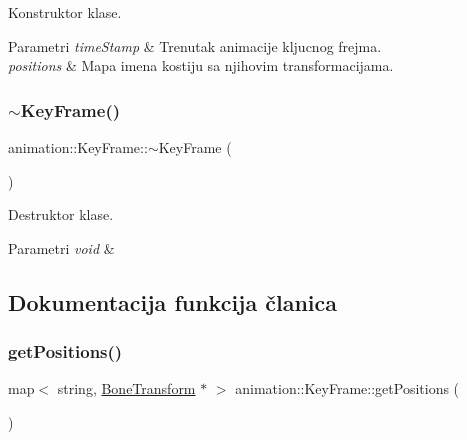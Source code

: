 Konstruktor klase. 


\begin{DoxyParams}{Parametri}
{\em time\+Stamp} & Trenutak animacije kljucnog frejma. \\
\hline
{\em positions} & Mapa imena kostiju sa njihovim transformacijama. \\
\hline
\end{DoxyParams}
\mbox{\label{classanimation_1_1KeyFrame_adf0e5cec6ec1d5d91d8fd68b1b523c12}} 
\subsubsection{\texorpdfstring{$\sim$\+Key\+Frame()}{~KeyFrame()}}
{\footnotesize\ttfamily animation\+::\+Key\+Frame\+::$\sim$\+Key\+Frame (\begin{DoxyParamCaption}{ }\end{DoxyParamCaption})}



Destruktor klase. 


\begin{DoxyParams}{Parametri}
{\em void} & \\
\hline
\end{DoxyParams}


\subsection{Dokumentacija funkcija članica}
\mbox{\label{classanimation_1_1KeyFrame_a0836ea59aee5e8ba67a683d40798f143}} 
\subsubsection{\texorpdfstring{get\+Positions()}{getPositions()}}
{\footnotesize\ttfamily map$<$ string, \hyperlink{classanimation_1_1BoneTransform}{Bone\+Transform} $\ast$ $>$ animation\+::\+Key\+Frame\+::get\+Positions (\begin{DoxyParamCaption}{ }\end{DoxyParamCaption})}



